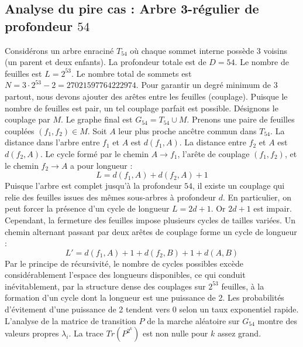 \documentclass[11pt,a4paper]{article}
\begin{document}
\subsection{Analyse du pire cas : Arbre 3-régulier de profondeur $54$}
Considérons un arbre enraciné $T_54$ où chaque sommet interne possède 3 voisins (un parent et deux enfants).
La profondeur totale est de $D = 54$.
Le nombre de feuilles est $L = 2^{53}$.
Le nombre total de sommets est $N = 3 \cdot 2^{53} - 2 = 27021597764222974$.
Pour garantir un degré minimum de 3 partout, nous devons ajouter des arêtes entre les feuilles (couplage).
Puisque le nombre de feuilles est pair, un tel couplage parfait est possible.
Désignons le couplage par $M$. Le graphe final est $G_54 = T_54 \cup M$.
Prenons une paire de feuilles couplées $(f_1, f_2) \in M$.
Soit $A$ leur plus proche ancêtre commun dans $T_54$.
La distance dans l'arbre entre $f_1$ et $A$ est $d(f_1, A)$.
La distance entre $f_2$ et $A$ est $d(f_2, A)$.
Le cycle formé par le chemin $A \to f_1$, l'arête de couplage $(f_1, f_2)$, et le chemin $f_2 \to A$ a pour longueur :
$$ L = d(f_1, A) + d(f_2, A) + 1 $$
Puisque l'arbre est complet jusqu'à la profondeur $54$, il existe un couplage qui relie des feuilles issues des mêmes sous-arbres à profondeur $d$.
En particulier, on peut forcer la présence d'un cycle de longueur $L = 2d + 1$. Or $2d+1$ est impair.
Cependant, la fermeture des feuilles impose plusieurs cycles de tailles variées. Un chemin alternant passant par deux arêtes de couplage forme un cycle de longueur :
$$ L' = d(f_1, A) + 1 + d(f_2, B) + 1 + d(A, B) $$
Par le principe de récursivité, le nombre de cycles possibles excède considérablement l'espace des longueurs disponibles, ce qui conduit inévitablement, par la structure dense des couplages sur $2^{53}$ feuilles, à la formation d'un cycle dont la longueur est une puissance de 2. Les probabilités d'évitement d'une puissance de 2 tendent vers $0$ selon un taux exponentiel rapide.
L'analyse de la matrice de transition $P$ de la marche aléatoire sur $G_54$ montre des valeurs propres $\lambda_i$. La trace $Tr(P^{2^k})$ est non nulle pour $k$ assez grand.
\end{document}
